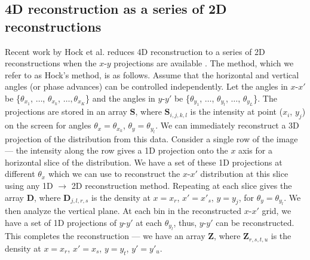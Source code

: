 \subsection{4D reconstruction as a series of 2D reconstructions}

Recent work by Hock et al. reduces 4D reconstruction to a series of 2D reconstructions when the $x$-$y$ projections are available \cite{Hock2013a}. The method, which we refer to as Hock's method, is as follows. Assume that the horizontal and vertical angles (or phase advances) can be controlled independently. Let the angles in $x$-$x'$ be \{$\theta_{x_1}$, $\dots$, $\theta_{x_k}$, $\dots, \theta_{x_K}$\} and the angles in $y$-$y'$ be \{$\theta_{y_1}$, $\dots$, $\theta_{y_l}$, $\dots$, $\theta_{y_L}$\}. The projections are stored in an array $\mathbf{S}$, where $\mathbf{S}_{i,j,k,l}$ is the intensity at point ($x_i$, $y_j$) on the screen for angles $\theta_x = \theta_{x_k}$, $\theta_y = \theta_{y_l}$. We can immediately reconstruct a 3D projection of the distribution from this data. Consider a single row of the image — the intensity along the row gives a 1D projection onto the $x$ axis for a horizontal slice of the distribution. We have a set of these 1D projections at different $\theta_{x}$ which we can use to reconstruct the $x$-$x'$ distribution at this slice using any 1D $\rightarrow$ 2D reconstruction method. Repeating at each slice gives the array $\mathbf{D}$, where $\mathbf{D}_{j, l, r, s}$ is the density at $x = x_r$, $x' = x'_s$, $y = y_j$, for $\theta_{y} = \theta_{y_l}$. We then analyze the vertical plane. At each bin in the reconstructed $x$-$x'$ grid, we have a set of 1D projections of $y$-$y'$ at each $\theta_{y_l}$, thus, $y$-$y'$ can be reconstructed. This completes the reconstruction — we have an array $\mathbf{Z}$, where $\mathbf{Z}_{r, s, t, u}$ is the density at $x = x_r$, $x' = x_s$, $y = y_t$, $y' = y'_u$.

